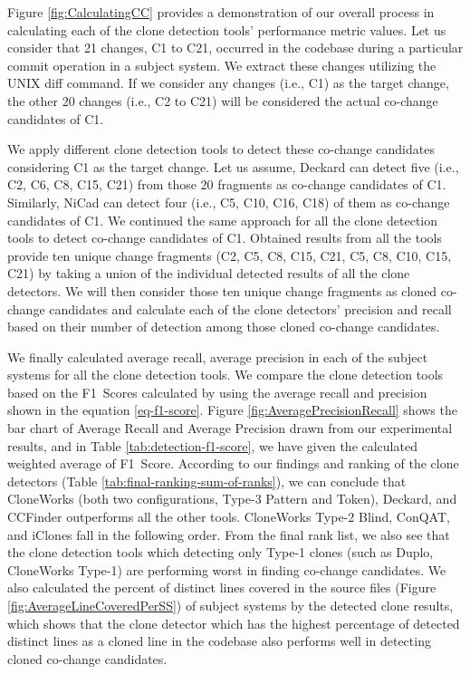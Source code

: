 \documentclass[review]{elsarticle}
\begin{document}
Figure \ref{fig:CalculatingCC} provides a demonstration of our overall process in calculating each of the clone detection tools' performance metric values. Let us consider that 21 changes, C1 to C21, occurred in the codebase during a particular commit operation in a subject system. We extract these changes utilizing the UNIX diff command. If we consider any changes (i.e., C1) as the target change, the other 20 changes (i.e., C2 to C21) will be considered the actual co-change candidates of C1.  


We apply different clone detection tools to detect these co-change candidates considering C1 as the target change. Let us assume, Deckard can detect five (i.e., C2, C6, C8, C15, C21) from those 20 fragments as co-change candidates of C1. Similarly, NiCad can detect four (i.e., C5, C10, C16, C18) of them as co-change candidates of C1. We continued the same approach for all the clone detection tools to detect co-change candidates of C1. Obtained results from all the tools provide ten unique change fragments (C2, C5, C8, C15, C21, C5, C8, C10, C15, C21) by taking a union of the individual detected results of all the clone detectors. We will then consider those ten unique change fragments as cloned co-change candidates and calculate each of the clone detectors' precision and recall based on their number of detection among those cloned co-change candidates. 

We finally calculated average recall, average precision in each of the subject systems for all the clone detection tools. We compare the clone detection tools based on the F1~Scores calculated by using the average recall and precision shown in the equation \ref{eq-f1-score}. Figure \ref{fig:AveragePrecisionRecall} shows the bar chart of Average Recall and Average Precision drawn from our experimental results, and in Table \ref{tab:detection-f1-score}, we have given the calculated weighted average of F1~Score. According to our findings and ranking of the clone detectors (Table \ref{tab:final-ranking-sum-of-ranks}), we can conclude that CloneWorks (both two configurations, Type-3 Pattern and Token), Deckard, and CCFinder outperforms all the other tools. CloneWorks Type-2 Blind, ConQAT, and iClones fall in the following order. From the final rank list, we also see that the clone detection tools which detecting only Type-1 clones (such as Duplo, CloneWorks Type-1) are performing worst in finding co-change candidates.  We also calculated the percent of distinct lines covered in the source files (Figure \ref{fig:AverageLineCoveredPerSS}) of subject systems by the detected clone results, which shows that the clone detector which has the highest percentage of detected distinct lines as a cloned line in the codebase also performs well in detecting cloned co-change candidates.
\end{document}

